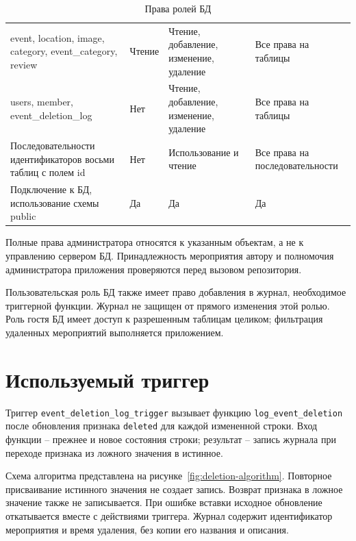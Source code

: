 \begin{table}[H]
    \caption{Права ролей БД}
    \label{tab:design-roles}
    \small
    \begin{tabularx}{\textwidth}{|L{5.2cm}|Y|Y|Y|}
        \hline
         &
         &
         &
         \\
        \hline
        event, location, image, category, event\_category, review & Чтение & Чтение, добавление, изменение, удаление & Все права на таблицы \\
        \hline
        users, member, event\_deletion\_log & Нет & Чтение, добавление, изменение, удаление & Все права на таблицы \\
        \hline
        Последовательности идентификаторов восьми таблиц с полем id & Нет & Использование и чтение & Все права на последовательности \\
        \hline
        Подключение к БД, использование схемы public & Да & Да & Да \\
        \hline
    \end{tabularx}
\end{table}

Полные права администратора относятся к указанным объектам, а не к управлению сервером БД. Принадлежность мероприятия автору и полномочия администратора приложения проверяются перед вызовом репозитория.

Пользовательская роль БД также имеет право добавления в журнал, необходимое триггерной функции. Журнал не защищен от прямого изменения этой ролью. Роль гостя БД имеет доступ к разрешенным таблицам целиком; фильтрация удаленных мероприятий выполняется приложением.

\section{Используемый триггер}

Триггер \texttt{event\_deletion\_log\_trigger} вызывает функцию \texttt{log\_event\_deletion} после обновления признака \texttt{deleted} для каждой измененной строки. Вход функции -- прежнее и новое состояния строки; результат -- запись журнала при переходе признака из ложного значения в истинное.

Схема алгоритма представлена на рисунке~\ref{fig:deletion-algorithm}. Повторное присваивание истинного значения не создает запись. Возврат признака в ложное значение также не записывается. При ошибке вставки исходное обновление откатывается вместе с действиями триггера. Журнал содержит идентификатор мероприятия и время удаления, без копии его названия и описания.

